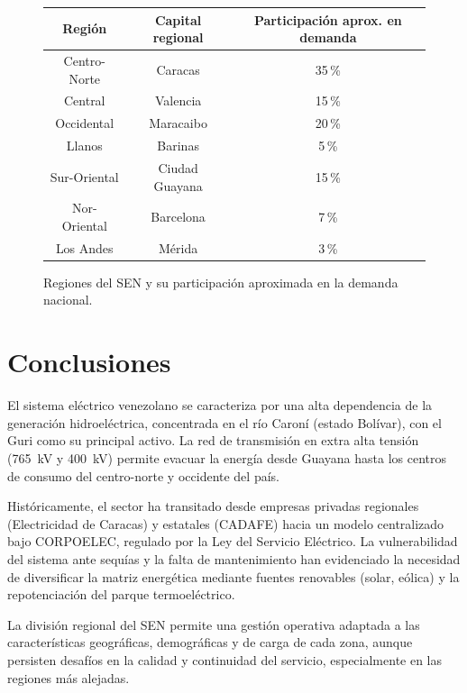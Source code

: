 \documentclass[12pt,a4paper]{article}
\begin{document}
\begin{figure}[H]
    \centering
    \begin{minipage}{0.85\textwidth}
    \centering
    \vspace{1em}
    \noindent
    \begin{tabular}{|c|c|c|}
        \hline
        \textbf{Región} & \textbf{Capital regional} & \textbf{Participación aprox. en demanda} \\
        \hline
        Centro-Norte & Caracas & 35\,\% \\
        Central & Valencia & 15\,\% \\
        Occidental & Maracaibo & 20\,\% \\
        Llanos & Barinas & 5\,\% \\
        Sur-Oriental & Ciudad Guayana & 15\,\% \\
        Nor-Oriental & Barcelona & 7\,\% \\
        Los Andes & Mérida & 3\,\% \\
        \hline
    \end{tabular}
    \caption{Regiones del SEN y su participación aproximada en la demanda nacional.}
    \end{minipage}
\end{figure}

\section{Conclusiones}

El sistema eléctrico venezolano se caracteriza por una alta dependencia
de la generación hidroeléctrica, concentrada en el río Caroní (estado
Bolívar), con el Guri como su principal activo. La red de transmisión
en extra alta tensión (\SI{765}{\kilo\volt} y \SI{400}{\kilo\volt})
permite evacuar la energía desde Guayana hasta los centros de consumo
del centro-norte y occidente del país.

Históricamente, el sector ha transitado desde empresas privadas
regionales (Electricidad de Caracas) y estatales (CADAFE) hacia un
modelo centralizado bajo CORPOELEC, regulado por la Ley del Servicio
Eléctrico. La vulnerabilidad del sistema ante sequías y la falta de
mantenimiento han evidenciado la necesidad de diversificar la matriz
energética mediante fuentes renovables (solar, eólica) y la
repotenciación del parque termoeléctrico.

La división regional del SEN permite una gestión operativa adaptada a
las características geográficas, demográficas y de carga de cada zona,
aunque persisten desafíos en la calidad y continuidad del servicio,
especialmente en las regiones más alejadas.
\end{document}
